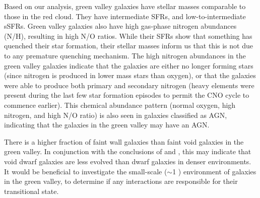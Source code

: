 Based on our analysis, green valley galaxies have stellar masses comparable to 
those in the red cloud.  They have intermediate SFRs, and low-to-intermediate 
sSFRs.  Green valley galaxies also have high gas-phase nitrogen abundances (N/H), 
resulting in high N/O ratios.  While their SFRs show that something has quenched 
their star formation, their stellar masses inform us that this is not due to any 
premature quenching mechanism.  The high nitrogen abundances in the green valley 
galaxies indicate that the galaxies are either no longer forming stars (since 
nitrogen is produced in lower mass stars than oxygen), or that the galaxies were 
able to produce both primary and secondary nitrogen (heavy elements were present 
during the last few star formation episodes to permit the CNO cycle to commence 
earlier).  This chemical abundance pattern (normal oxygen, high nitrogen, and 
high N/O ratio) is also seen in galaxies classified as AGN, indicating that the 
galaxies in the green valley may have an AGN.

There is a higher fraction of faint wall galaxies than faint void galaxies in 
the green valley.  In conjunction with the conclusions of \cite{Douglass17b} and 
\cite{Douglass17c}, this may indicate that void dwarf galaxies are less evolved 
than dwarf galaxies in denser environments.  It would be beneficial to 
investigate the small-scale ($\sim$1 \hMpc) environment of galaxies in the green 
valley, to determine if any interactions are responsible for their transitional 
state.